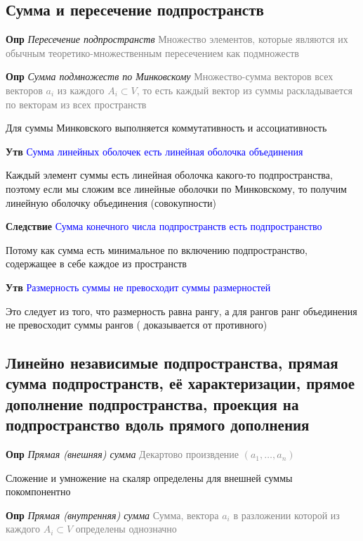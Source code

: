 \subsection{Сумма и пересечение подпространств}

\textbf{Опр} \textit{Пересечение подпространств} \textcolor{gray}{Множество элементов, которые являются их
обычным теоретико-множественным пересечением как подмножеств}

\textbf{Опр} \textit{Сумма подмножеств по Минковскому} \textcolor{gray}{Множество-сумма векторов всех векторов $
a_i$ из каждого $A_i \subset V$, то есть каждый вектор из суммы раскладывается по векторам из всех пространств}

Для суммы Минковского выполняется коммутативность и ассоциативность

\textbf{Утв} \textcolor{blue}{Сумма линейных оболочек есть линейная оболочка объединения}

Каждый элемент суммы есть линейная оболочка какого-то подпространства, поэтому если мы сложим все линейные
оболочки по Минковскому, то получим линейную оболочку объединения (совокупности)

\textbf{Следствие} \textcolor{blue}{Сумма конечного числа подпространств есть подпространство}

Потому как сумма есть минимальное по включению подпространство, содержащее в себе каждое из пространств

\textbf{Утв} \textcolor{blue}{Размерность суммы не превосходит суммы размерностей}

Это следует из того, что размерность равна рангу, а для рангов ранг объединения не превосходит суммы рангов (
доказывается от противного)

\subsection{Линейно независимые подпространства, прямая сумма подпространств, её характеризации, прямое дополнение
подпространства, проекция на подпространство вдоль прямого дополнения}

\textbf{Опр} \textit{Прямая (внешняя) сумма} \textcolor{gray}{Декартово произвдение $(a_1, \dots, a_n)$}

Сложение и умножение на скаляр определены для внешней суммы покомпонентно

\textbf{Опр} \textit{Прямая (внутренняя) сумма} \textcolor{gray}{Сумма, вектора $
a_i$ в разложении которой из каждого $A_i \subset V$ определены однозначно}


